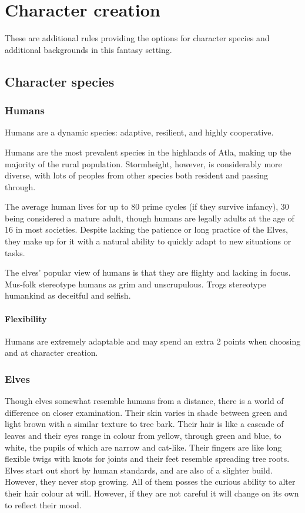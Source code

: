 \documentclass[a4paper,11pt,oneside]{book}
\newcommand{\textlf}[1]{\textbf{\titlecap{#1}}}
\begin{document}
\chapter{Character creation}
These are additional rules providing the options for character species and additional backgrounds in this fantasy setting.

\section{Character species}

\subsection{Humans}
Humans are a dynamic species: adaptive, resilient, and highly cooperative.

Humans are the most prevalent species in the highlands of Atla, making up the majority of the rural population. Stormheight, however, is considerably more diverse, with lots of peoples from other species both resident and passing through.

The average human lives for up to 80 prime cycles (if they survive infancy), 30 being considered a mature adult, though humans are legally adults at the age of 16 in most societies. Despite lacking the patience or long practice of the Elves, they make up for it with a natural ability to quickly adapt to new situations or tasks. 

The elves' popular view of humans is that they are flighty and lacking in focus. Mus-folk stereotype humans as grim and unscrupulous. Trogs stereotype humankind as deceitful and selfish.  

\subsubsection*{Flexibility}
Humans are extremely adaptable and may spend an extra 2 points when choosing \textlf{perks} and \textlf{proficiencies} at character creation.


\subsection{Elves}
Though elves somewhat resemble humans from a distance, there is a world of difference on closer examination. Their skin varies in shade between green and light brown with a similar texture to tree bark. Their hair is like a cascade of leaves and their eyes range in colour from yellow, through green and blue, to white, the pupils of which are narrow and cat-like. Their fingers are like long flexible twigs with knots for joints and their feet resemble spreading tree roots. Elves start out short by human standards, and are also of a slighter build. However, they never stop growing. All of them posses the curious ability to alter their hair colour at will. However, if they are not careful it will change on its own to reflect their mood. 
\end{document}
